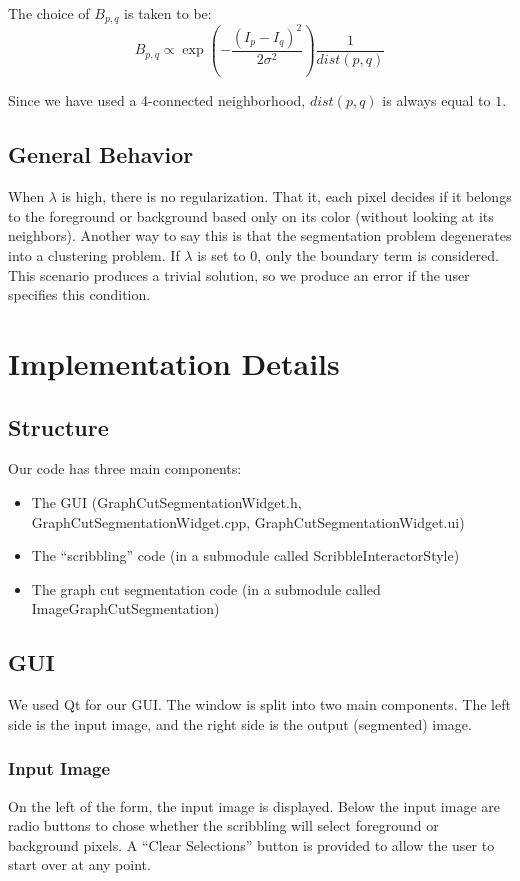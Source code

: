 \documentclass{InsightArticle}
\begin{document}
The choice of $B_{p,q}$ is taken to be:
\begin{equation}
 B_{p,q} \propto \exp\left(-\frac{(I_p - I_q)^2}{2\sigma^2}\right) \frac{1}{dist(p,q)}
\end{equation}

Since we have used a 4-connected neighborhood, $dist(p,q)$ is always equal to $1$.

\subsection{General Behavior}
When $\lambda$ is high, there is no regularization. That it, each pixel decides if it belongs to the foreground or background based only on its color (without looking at its neighbors). Another way to say this is that the segmentation problem degenerates into a clustering problem. If $\lambda$ is set to $0$, only the boundary term is considered. This scenario produces a trivial solution, so we produce an error if the user specifies this condition.

\section{Implementation Details}
\subsection{Structure}
Our code has three main components: 
\begin{itemize}
\item The GUI (GraphCutSegmentationWidget.h, GraphCutSegmentationWidget.cpp, GraphCutSegmentationWidget.ui)
\item The ``scribbling'' code (in a submodule called ScribbleInteractorStyle)
\item The graph cut segmentation code (in a submodule called ImageGraphCutSegmentation)
\end{itemize}
 
\subsection{GUI}
\label{subsec:GUI}
We used Qt for our GUI. The window is split into two main components. The left side is the input image, and the right side is the output (segmented) image.
\subsubsection{Input Image}
On the left of the form, the input image is displayed. Below the input image are radio buttons to chose whether the scribbling will select foreground or background pixels. A ``Clear Selections'' button is provided to allow the user to start over at any point.
\end{document}
